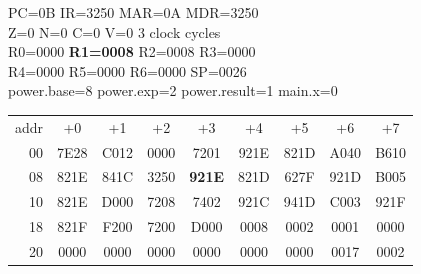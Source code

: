 \begin{tcolorbox}[stepbox, title={Step 15 \hfill PC 0A \quad MUL R1, R1, R2}]
PC=0B IR=3250 MAR=0A MDR=3250\\
Z=0 N=0 C=0 V=0 \hfill \textcolor{dim}{3 clock cycles}\\
R0=0000 \textcolor{wrt}{\textbf{R1=0008}} R2=0008 R3=0000\\
R4=0000 R5=0000 R6=0000 SP=0026\\
\textcolor{dim}{power.base=8  power.exp=2  power.result=1  main.x=0}\\[1pt]
{\setlength{\tabcolsep}{1.6pt}\begin{tabular}{@{}r*{8}{c}@{}}
\textcolor{dim}{addr} & \textcolor{dim}{+0} & \textcolor{dim}{+1} & \textcolor{dim}{+2} & \textcolor{dim}{+3} & \textcolor{dim}{+4} & \textcolor{dim}{+5} & \textcolor{dim}{+6} & \textcolor{dim}{+7}\\
\textcolor{dim}{00} & 7E28 & C012 & 0000 & 7201 & 921E & 821D & A040 & B610\\
\textcolor{dim}{08} & 821E & 841C & 3250 & \cellcolor{pcc}\textbf{921E} & 821D & 627F & 921D & B005\\
\textcolor{dim}{10} & 821E & D000 & 7208 & 7402 & 921C & 941D & C003 & 921F\\
\textcolor{dim}{18} & 821F & F200 & 7200 & D000 & \cellcolor{datac}0008 & \cellcolor{datac}0002 & \cellcolor{datac}0001 & \cellcolor{datac}0000\\
\textcolor{dim}{20} & \cellcolor{stackc}0000 & \cellcolor{stackc}0000 & \cellcolor{stackc}0000 & \cellcolor{stackc}0000 & \cellcolor{stackc}0000 & \cellcolor{stackc}0000 & \cellcolor{stackc}0017 & \cellcolor{stackc}0002\\
\end{tabular}}
\end{tcolorbox}\par\vspace{3pt}
